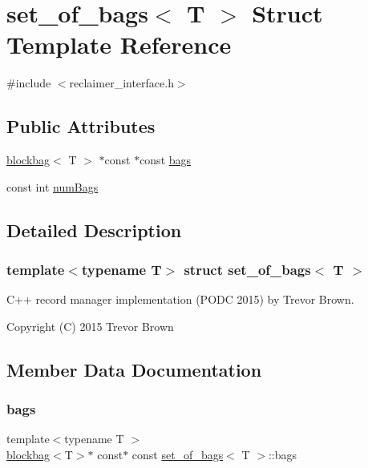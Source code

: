 \hypertarget{structset__of__bags}{}\section{set\+\_\+of\+\_\+bags$<$ T $>$ Struct Template Reference}
\label{structset__of__bags}


{\ttfamily \#include $<$reclaimer\+\_\+interface.\+h$>$}

\subsection*{Public Attributes}
\begin{DoxyCompactItemize}
\item 
\hyperlink{classblockbag}{blockbag}$<$ T $>$ $\ast$const  $\ast$const \hyperlink{structset__of__bags_aece6bb3de813afff53aeec6c67ce2460}{bags}
\item 
const int \hyperlink{structset__of__bags_ae2c6de80fdeed02cd5c87aa207dd8458}{num\+Bags}
\end{DoxyCompactItemize}


\subsection{Detailed Description}
\subsubsection*{template$<$typename T$>$\newline
struct set\+\_\+of\+\_\+bags$<$ T $>$}

C++ record manager implementation (P\+O\+DC 2015) by Trevor Brown.

Copyright (C) 2015 Trevor Brown 

\subsection{Member Data Documentation}
\mbox{\label{structset__of__bags_aece6bb3de813afff53aeec6c67ce2460}} 
\subsubsection{\texorpdfstring{bags}{bags}}
{\footnotesize\ttfamily template$<$typename T $>$ \\
\hyperlink{classblockbag}{blockbag}$<$T$>$$\ast$ const$\ast$ const \hyperlink{structset__of__bags}{set\+\_\+of\+\_\+bags}$<$ T $>$\+::bags}

